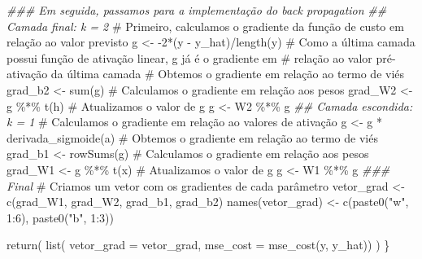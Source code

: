 \documentclass[
  a4paperpaper,
]{article}
\newenvironment{Shaded}{\begin{snugshade}}{\end{snugshade}}
\newcommand{\AttributeTok}[1]{\textcolor[rgb]{0.40,0.45,0.13}{#1}}
\newcommand{\CommentTok}[1]{\textcolor[rgb]{0.37,0.37,0.37}{#1}}
\newcommand{\DecValTok}[1]{\textcolor[rgb]{0.68,0.00,0.00}{#1}}
\newcommand{\DocumentationTok}[1]{\textcolor[rgb]{0.37,0.37,0.37}{\textit{#1}}}
\newcommand{\FunctionTok}[1]{\textcolor[rgb]{0.28,0.35,0.67}{#1}}
\newcommand{\NormalTok}[1]{\textcolor[rgb]{0.00,0.23,0.31}{#1}}
\newcommand{\OtherTok}[1]{\textcolor[rgb]{0.00,0.23,0.31}{#1}}
\newcommand{\SpecialCharTok}[1]{\textcolor[rgb]{0.37,0.37,0.37}{#1}}
\newcommand{\StringTok}[1]{\textcolor[rgb]{0.13,0.47,0.30}{#1}}
\begin{document}
\begin{Shaded}
\begin{Highlighting}[]
  \DocumentationTok{\#\#\# Em seguida, passamos para a implementação do back propagation}
  \DocumentationTok{\#\# Camada final: k = 2}
  \CommentTok{\# Primeiro, calculamos o gradiente da função de custo em relação ao valor previsto}
\NormalTok{  g }\OtherTok{\textless{}{-}} \SpecialCharTok{{-}}\DecValTok{2}\SpecialCharTok{*}\NormalTok{(y }\SpecialCharTok{{-}}\NormalTok{ y\_hat)}\SpecialCharTok{/}\FunctionTok{length}\NormalTok{(y)}
  \CommentTok{\# Como a última camada possui função de ativação linear, g já é o gradiente em}
  \CommentTok{\# relação ao valor pré{-}ativação da última camada}
  \CommentTok{\# Obtemos o gradiente em relação ao termo de viés}
\NormalTok{  grad\_b2 }\OtherTok{\textless{}{-}} \FunctionTok{sum}\NormalTok{(g)}
  \CommentTok{\# Calculamos o gradiente em relação aos pesos}
\NormalTok{  grad\_W2 }\OtherTok{\textless{}{-}}\NormalTok{ g }\SpecialCharTok{\%*\%} \FunctionTok{t}\NormalTok{(h)}
  \CommentTok{\# Atualizamos o valor de g}
\NormalTok{  g }\OtherTok{\textless{}{-}}\NormalTok{ W2 }\SpecialCharTok{\%*\%}\NormalTok{ g}
  \DocumentationTok{\#\# Camada escondida: k = 1}
  \CommentTok{\# Calculamos o gradiente em relação ao valores de ativação}
\NormalTok{  g }\OtherTok{\textless{}{-}}\NormalTok{ g }\SpecialCharTok{*} \FunctionTok{derivada\_sigmoide}\NormalTok{(a)}
  \CommentTok{\# Obtemos o gradiente em relação ao termo de viés}
\NormalTok{  grad\_b1 }\OtherTok{\textless{}{-}} \FunctionTok{rowSums}\NormalTok{(g)}
  \CommentTok{\# Calculamos o gradiente em relação aos pesos}
\NormalTok{  grad\_W1 }\OtherTok{\textless{}{-}}\NormalTok{ g }\SpecialCharTok{\%*\%} \FunctionTok{t}\NormalTok{(x)}
  \CommentTok{\# Atualizamos o valor de g}
\NormalTok{  g }\OtherTok{\textless{}{-}}\NormalTok{ W1 }\SpecialCharTok{\%*\%}\NormalTok{ g}
  \DocumentationTok{\#\#\# Final}
  \CommentTok{\# Criamos um vetor com os gradientes de cada parâmetro}
\NormalTok{  vetor\_grad }\OtherTok{\textless{}{-}} \FunctionTok{c}\NormalTok{(grad\_W1, grad\_W2, grad\_b1, grad\_b2)}
  \FunctionTok{names}\NormalTok{(vetor\_grad) }\OtherTok{\textless{}{-}} \FunctionTok{c}\NormalTok{(}\FunctionTok{paste0}\NormalTok{(}\StringTok{"w"}\NormalTok{, }\DecValTok{1}\SpecialCharTok{:}\DecValTok{6}\NormalTok{), }\FunctionTok{paste0}\NormalTok{(}\StringTok{"b"}\NormalTok{, }\DecValTok{1}\SpecialCharTok{:}\DecValTok{3}\NormalTok{))}
  
  \FunctionTok{return}\NormalTok{(}
    \FunctionTok{list}\NormalTok{(}
      \AttributeTok{vetor\_grad =}\NormalTok{ vetor\_grad,}
      \AttributeTok{mse\_cost =} \FunctionTok{mse\_cost}\NormalTok{(y, y\_hat))}
\NormalTok{    )}
\NormalTok{\}}



\end{Highlighting}
\end{Shaded}
\end{document}
